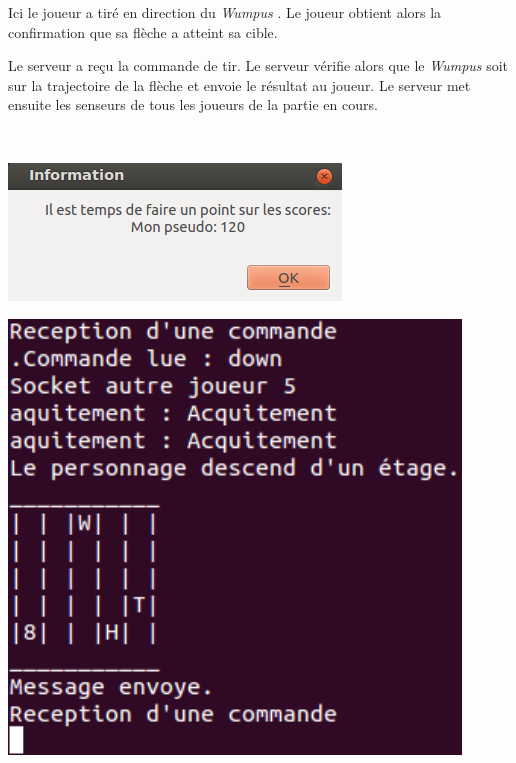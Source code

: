 \documentclass[a4paper,10pt]{article}
\newcommand{\gameName}{\emph{Wumpus }}
\begin{document}
		\begin{minipage}[t]{0.46\textwidth}
			\vspace{2pt}
			Ici le joueur a tiré en direction du \gameName. Le joueur obtient alors la confirmation que sa flèche a atteint sa cible.
		\end{minipage}
		\hfill
		\begin{minipage}[t]{0.46\textwidth}
			\vspace{2pt}
			Le serveur a reçu la commande de tir. Le serveur vérifie alors que le \gameName soit sur la trajectoire de la flèche et envoie le résultat au
joueur. Le serveur met ensuite les senseurs de tous les joueurs de la partie en cours.
		\end{minipage}\\


		\begin{minipage}[t]{0.46\textwidth}
			\vspace{50pt}
			\centering
			\includegraphics[width=.96\textwidth]{JeuxDEssais/Wumpus7.png}
		\end{minipage}
		\hfill
		\begin{minipage}[t]{0.46\textwidth}
			\vspace{2pt}
			\centering
			\includegraphics[width=0.9\textwidth]{JeuxDEssais/Serveur7.png}
		\end{minipage}
\end{document}
